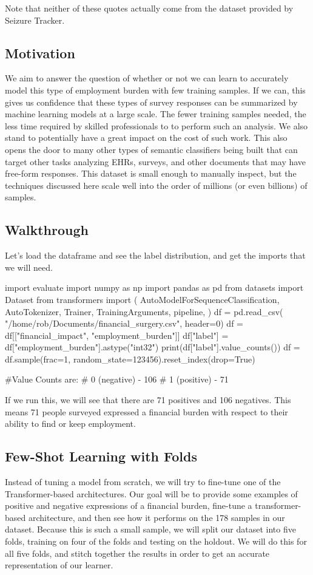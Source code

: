 Note that neither of these quotes actually come from the dataset provided by Seizure Tracker.

\subsection{Motivation}
We aim to answer the question of whether or not we can learn to accurately model this type of employment burden with few training samples. If we can, this gives us confidence that these types of survey responses
can be summarized by machine learning models at a large scale. The fewer training samples needed, the less time required by skilled professionals to to perform such an analysis. We also stand to potentially have a great impact on the cost of such work.
This also opens the door to many other types of semantic classifiers being built that can target other tasks analyzing EHRs, surveys, and other documents that may have free-form responses.
This dataset is small enough to manually inspect, but the techniques discussed here scale well into the order of millions (or even billions) of samples.


\subsection{Walkthrough}

Let's load the dataframe and see the label distribution, and get the imports that we will need.

\begin{python}

import evaluate
import numpy as np
import pandas as pd
from datasets import Dataset
from transformers import (
    AutoModelForSequenceClassification,
    AutoTokenizer,
    Trainer,
    TrainingArguments,
    pipeline,
)
df = pd.read_csv(
    "/home/rob/Documents/financial_surgery.csv",
    header=0)
df = df[["financial_impact", "employment_burden"]]
df["label"] = df["employment_burden"].astype("int32")
print(df["label"].value_counts())
df = df.sample(frac=1,
    random_state=123456).reset_index(drop=True)

#Value Counts are:
# 0 (negative) - 106
# 1 (positive) - 71
\end{python}

If we run this, we will see that there are 71 positives and 106 negatives. This means 71 people surveyed expressed a financial burden
with respect to their ability to find or keep employment.

\subsection{Few-Shot Learning with Folds}
Instead of tuning a model from scratch, we will try to fine-tune one of the Transformer-based architectures. Our goal will be to provide some examples of positive and negative expressions of a financial burden, fine-tune a transformer-based
architecture, and then see how it performs on the 178 samples in our dataset. Because this is such a small sample, we will split our dataset into five folds, training on four of the folds and testing on the holdout. We will do this for all
five folds, and stitch together the results in order to get an accurate representation of our learner.

